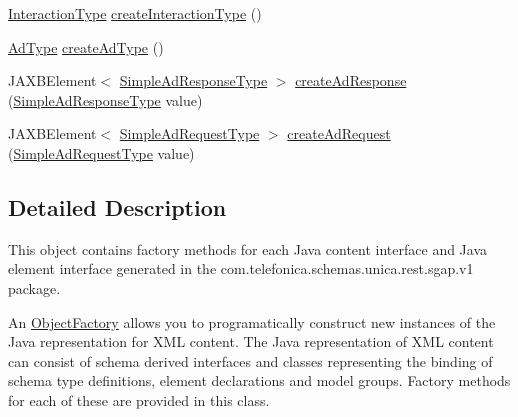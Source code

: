 \begin{DoxyCompactItemize}
\item 
\hyperlink{classcom_1_1telefonica_1_1schemas_1_1unica_1_1rest_1_1sgap_1_1v1_1_1InteractionType}{InteractionType} \hyperlink{classcom_1_1telefonica_1_1schemas_1_1unica_1_1rest_1_1sgap_1_1v1_1_1ObjectFactory_a09efd73f02c6049ce51595e16f912173}{createInteractionType} ()
\item 
\hyperlink{classcom_1_1telefonica_1_1schemas_1_1unica_1_1rest_1_1sgap_1_1v1_1_1AdType}{AdType} \hyperlink{classcom_1_1telefonica_1_1schemas_1_1unica_1_1rest_1_1sgap_1_1v1_1_1ObjectFactory_a0c13967117580cb3274e2b51c99cf257}{createAdType} ()
\item 
JAXBElement$<$ \hyperlink{classcom_1_1telefonica_1_1schemas_1_1unica_1_1rest_1_1sgap_1_1v1_1_1SimpleAdResponseType}{SimpleAdResponseType} $>$ \hyperlink{classcom_1_1telefonica_1_1schemas_1_1unica_1_1rest_1_1sgap_1_1v1_1_1ObjectFactory_a41d538cca872ed2f20f19efcad0bf358}{createAdResponse} (\hyperlink{classcom_1_1telefonica_1_1schemas_1_1unica_1_1rest_1_1sgap_1_1v1_1_1SimpleAdResponseType}{SimpleAdResponseType} value)
\item 
JAXBElement$<$ \hyperlink{classcom_1_1telefonica_1_1schemas_1_1unica_1_1rest_1_1sgap_1_1v1_1_1SimpleAdRequestType}{SimpleAdRequestType} $>$ \hyperlink{classcom_1_1telefonica_1_1schemas_1_1unica_1_1rest_1_1sgap_1_1v1_1_1ObjectFactory_afc955cd11fb7af9e396939d982e5b231}{createAdRequest} (\hyperlink{classcom_1_1telefonica_1_1schemas_1_1unica_1_1rest_1_1sgap_1_1v1_1_1SimpleAdRequestType}{SimpleAdRequestType} value)
\end{DoxyCompactItemize}


\subsection{Detailed Description}
This object contains factory methods for each Java content interface and Java element interface generated in the com.telefonica.schemas.unica.rest.sgap.v1 package. 

An \hyperlink{classcom_1_1telefonica_1_1schemas_1_1unica_1_1rest_1_1sgap_1_1v1_1_1ObjectFactory}{ObjectFactory} allows you to programatically construct new instances of the Java representation for XML content. The Java representation of XML content can consist of schema derived interfaces and classes representing the binding of schema type definitions, element declarations and model groups. Factory methods for each of these are provided in this class. 

